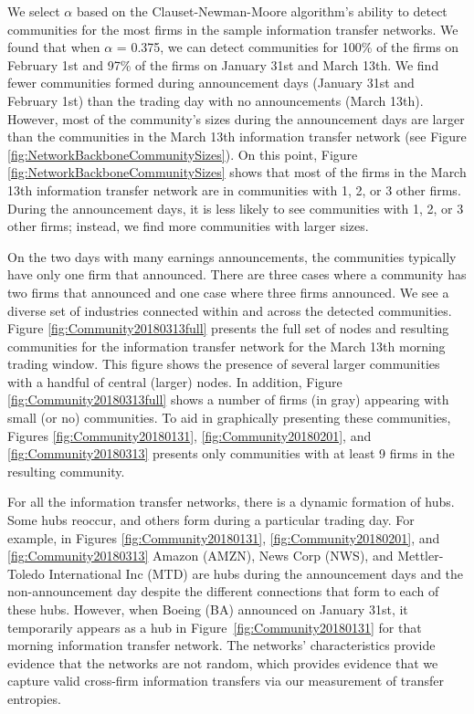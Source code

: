 We select \(\alpha\) based on the Clauset-Newman-Moore algorithm’s ability to detect communities for the most firms in the sample information transfer networks.  We found that when \(\alpha\) = 0.375,  we can detect communities for 100\% of the firms on February 1st and 97\% of the firms on January 31st and March 13th.  We find fewer communities formed during announcement days (January 31st and February 1st) than the trading day with no announcements (March 13th).  However,  most of the community’s sizes during the announcement days are larger than the communities in the March 13th information transfer network (see Figure \ref{fig:NetworkBackboneCommunitySizes}).  On this point,  Figure \ref{fig:NetworkBackboneCommunitySizes} shows that most of the firms in the March 13th information transfer network are in communities with 1, 2, or 3 other firms. During the announcement days, it is less likely to see communities with 1, 2, or 3 other firms; instead, we find more communities with larger sizes.

On the two days with many earnings announcements,  the communities typically have only one firm that announced.  There are three cases where a community has two firms that announced and one case where three firms announced. We see a diverse set of industries connected within and across the detected communities.   Figure \ref{fig:Community20180313full} presents the full set of nodes and resulting communities for the information transfer network for the March 13th morning trading window. This figure shows the presence of several larger communities with a handful of central (larger) nodes. In addition, Figure \ref{fig:Community20180313full} shows a number of firms (in gray) appearing with small (or no) communities.   To aid in graphically presenting these communities, Figures \ref{fig:Community20180131},  \ref{fig:Community20180201}, and \ref{fig:Community20180313}  presents only communities with at least 9 firms in the resulting community.  

For all the information transfer networks, there is a dynamic formation of hubs.  Some hubs reoccur, and others form during a particular trading day.   For example,  in Figures \ref{fig:Community20180131},  \ref{fig:Community20180201}, and \ref{fig:Community20180313} Amazon (AMZN), News Corp (NWS), and Mettler-Toledo International Inc (MTD) are hubs during the announcement days and the non-announcement day despite the different connections that form to each of these hubs.  However, when Boeing (BA) announced on January 31st, it temporarily appears as a hub in Figure~\ref{fig:Community20180131} for that morning information transfer network. The networks' characteristics provide evidence that the networks are not random, which provides evidence that we capture valid cross-firm information transfers via our measurement of transfer entropies. 
 

